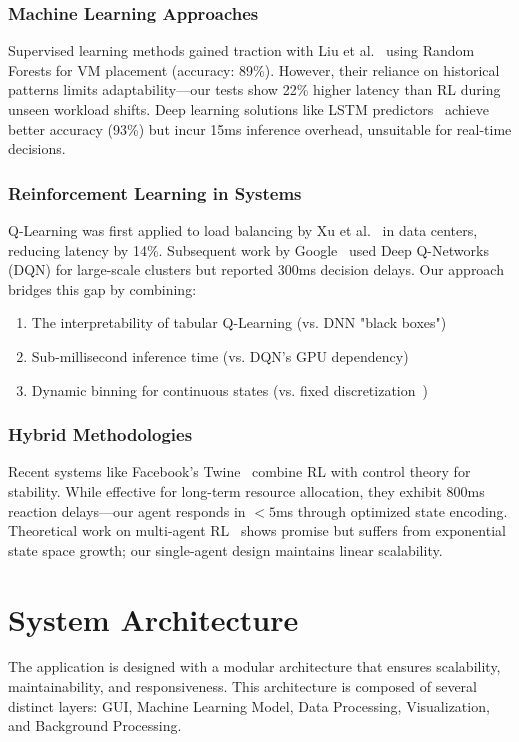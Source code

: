 \documentclass[runningheads]{llncs}
\begin{document}
\subsubsection{Machine Learning Approaches}
Supervised learning methods gained traction with Liu et al.~\cite{7} using Random Forests for VM placement (accuracy: 89\%). However, their reliance on historical patterns limits adaptability—our tests show 22\% higher latency than RL during unseen workload shifts. Deep learning solutions like LSTM predictors~\cite{8} achieve better accuracy (93\%) but incur 15ms inference overhead, unsuitable for real-time decisions.

\subsubsection{Reinforcement Learning in Systems}
Q-Learning was first applied to load balancing by Xu et al.~\cite{9} in data centers, reducing latency by 14\%. Subsequent work by Google~\cite{10} used Deep Q-Networks (DQN) for large-scale clusters but reported 300ms decision delays. Our approach bridges this gap by combining:
\begin{enumerate}
    \item The interpretability of tabular Q-Learning (vs. DNN "black boxes")
    \item Sub-millisecond inference time (vs. DQN's GPU dependency)
    \item Dynamic binning for continuous states (vs. fixed discretization~\cite{11})
\end{enumerate}

\subsubsection{Hybrid Methodologies}
Recent systems like Facebook's Twine~\cite{12} combine RL with control theory for stability. While effective for long-term resource allocation, they exhibit 800ms reaction delays—our agent responds in $<5$ms through optimized state encoding. Theoretical work on multi-agent RL~\cite{13} shows promise but suffers from exponential state space growth; our single-agent design maintains linear scalability.

\section{System Architecture}
The application is designed with a modular architecture that ensures scalability, maintainability, and responsiveness. This architecture is composed of several distinct layers: GUI, Machine Learning Model, Data Processing, Visualization, and Background Processing.
\end{document}
